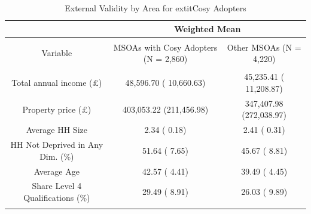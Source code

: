 
\begin{table}[!htbp] \centering 
  \caption{External Validity by Area for 	extit{Cosy} Adopters} 
  \label{tab:msoa-stats-cosy} 
\begin{tabular}{@{\extracolsep{5pt}} ccc} 
\\[-1.8ex]\hline\hline 
 & \multicolumn{2}{c}{Weighted Mean} \\
\hline \\[-1.8ex] 
Variable & MSOAs with Cosy Adopters (N = 2,860) & Other MSOAs (N = 4,220) \\ 
\hline \\[-1.8ex] 
Total annual income (£) &  48,596.70 ( 10,660.63) &  45,235.41 ( 11,208.87) \\ 
Property price (£) & 403,053.22 (211,456.98) & 347,407.98 (272,038.97) \\ 
Average HH Size &       2.34 (      0.18) &       2.41 (      0.31) \\ 
HH Not Deprived in Any Dim. (\%) &      51.64 (      7.65) &      45.67 (      8.81) \\ 
Average Age &      42.57 (      4.41) &      39.49 (      4.45) \\ 
Share Level 4 Qualifications (\%) &      29.49 (      8.91) &      26.03 (      9.89) \\ 
\hline\hline \\[-1.8ex] 
\end{tabular} 
\end{table} 
